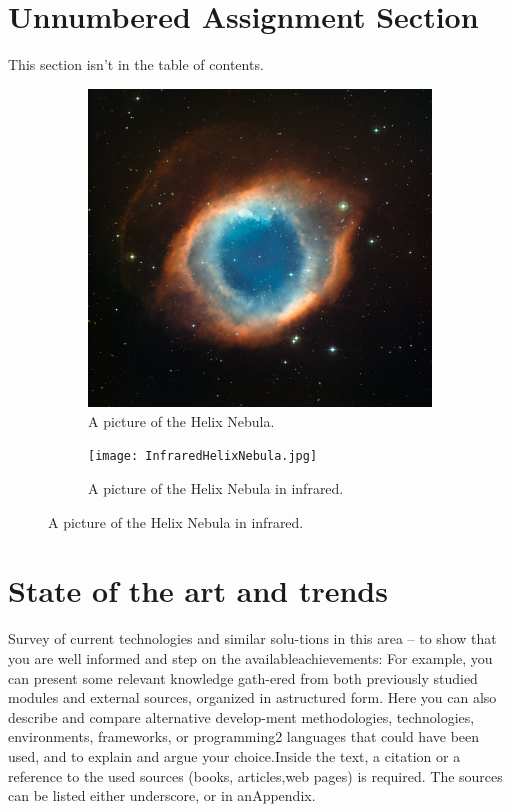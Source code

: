 \documentclass[
english, %
headsepline, %
]{scrartcl} %
\begin{document}
\section*{Unnumbered Assignment Section}
\label{sec:Unnumbered Assignment Section}
    This section isn't in the table of contents.


\begin{figure}
    \caption{A picture of the Helix Nebula.} %
    \centering %
    \begin{subfigure}[b]{0.3\textwidth}
        \includegraphics[width=\textwidth]{HelixNebula.jpg}
        \caption{A picture of the Helix Nebula.} %
        \label{fig:HelixNebula}
    \end{subfigure}
    \begin{subfigure}[b]{0.3\textwidth}
        \texttt{[image: InfraredHelixNebula.jpg]}
        \caption{A picture of the Helix Nebula in infrared.} %
        \label{fig:InfraredHelixNebula}
    \end{subfigure}
  \end{figure}

\section{State of the art and trends}
\label{sec:State of the art and trends}
    Survey of current technologies and similar solu-tions in this area – to show that you are well informed and step on the availableachievements: 
    For  example,  you  can  present  some  relevant  knowledge  gath-ered from both previously studied modules and external sources, organized in astructured form.  
    Here you can also describe and compare alternative develop-ment methodologies, technologies, environments, frameworks, or programming2
    languages  that  could  have  been  used,  and  to  explain  and  argue  your  choice.Inside the  text,  a citation or a reference  to the used  sources (books,  articles,web pages) is required.  The sources can be listed either underscore,  or in anAppendix.
\end{document}
